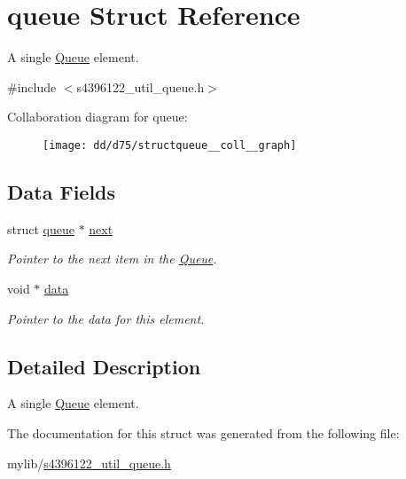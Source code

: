 \hypertarget{structqueue}{}\section{queue Struct Reference}
\label{structqueue}


A single \hyperlink{structQueue}{Queue} element.  




{\ttfamily \#include $<$s4396122\+\_\+util\+\_\+queue.\+h$>$}



Collaboration diagram for queue\+:\nopagebreak
\begin{figure}[H]
\begin{center}
\leavevmode
\texttt{[image: dd/d75/structqueue\_\_coll\_\_graph]}
\end{center}
\end{figure}
\subsection*{Data Fields}
\begin{DoxyCompactItemize}
\item 
struct \hyperlink{structqueue}{queue} $\ast$ \hyperlink{structqueue_ad9a4d0c0515c80148e0ca26f99ac4feb}{next}\hypertarget{structqueue_ad9a4d0c0515c80148e0ca26f99ac4feb}{}\label{structqueue_ad9a4d0c0515c80148e0ca26f99ac4feb}

\begin{DoxyCompactList}\small\item\em Pointer to the next item in the \hyperlink{structQueue}{Queue}. \end{DoxyCompactList}\item 
void $\ast$ \hyperlink{structqueue_a36d42bcd5973f1c6d1f45df1bc0b209c}{data}\hypertarget{structqueue_a36d42bcd5973f1c6d1f45df1bc0b209c}{}\label{structqueue_a36d42bcd5973f1c6d1f45df1bc0b209c}

\begin{DoxyCompactList}\small\item\em Pointer to the data for this element. \end{DoxyCompactList}\end{DoxyCompactItemize}


\subsection{Detailed Description}
A single \hyperlink{structQueue}{Queue} element. 

The documentation for this struct was generated from the following file\+:\begin{DoxyCompactItemize}
\item 
mylib/\hyperlink{s4396122__util__queue_8h}{s4396122\+\_\+util\+\_\+queue.\+h}\end{DoxyCompactItemize}
